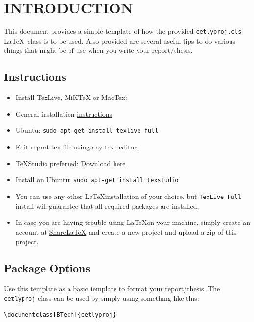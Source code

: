 \documentclass[BTech]{cetlyproj}
\begin{document}



\chapter{INTRODUCTION}
\label{chap:intro}

This document provides a simple template of how the provided
\verb+cetlyproj.cls+ \LaTeX\ class is to be used.  Also provided are
several useful tips to do various things that might be of use when you
write your report/thesis.\par

\section{Instructions}
\begin{itemize}
	\item Install TexLive, MiKTeX or MacTex:
	\item General installation \href{http://www.tug.org/texlive/acquire-netinstall.html}{instructions}
	\item Ubuntu: \verb+sudo apt-get install texlive-full+
	\item Edit report.tex file using any text editor.
	\item TeXStudio preferred: \href{http://www.texstudio.org/}{Download here}
	\item Install on Ubuntu: \verb+sudo apt-get install texstudio+
	\item You can use any other \LaTeX installation of your choice, but \verb+TexLive Full+ install will guarantee that all required packages are installed.
	\item In case you are having trouble using \LaTeX on your machine, simply create an account at \href{https://www.sharelatex.com/}{ShareLaTeX} and create a new project and upload a zip of this project.
\end{itemize}
\section{Package Options}

Use this template as a basic template to format your report/thesis.  The
\verb+cetlyproj+ class can be used by simply using something like this:
\begin{verbatim}
\documentclass[BTech]{cetlyproj}  
\end{verbatim}
\end{document}
